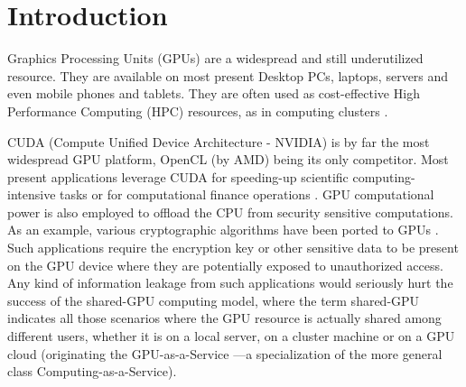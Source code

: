 \documentclass[11pt,onecolumn,letterpaper]{IEEEtran}
\begin{document}
\section{Introduction}

Graphics Processing Units (GPUs) are a widespread and still underutilized resource.
They are available on most present Desktop PCs, laptops, servers and even mobile phones and tablets.
They are often used as cost-effective High Performance Computing (HPC) resources, as in computing clusters \cite{titan}. 


CUDA (Compute Unified Device Architecture - NVIDIA\texttrademark) is by far the most widespread GPU platform, OpenCL (by AMD\texttrademark) being its only competitor.
Most present applications leverage CUDA for speeding-up scientific computing-intensive tasks
or for computational finance operations \cite{computationalfinancegpu}.
GPU computational power is also employed to offload the CPU from  security sensitive computations.
As an example, various cryptographic algorithms have been ported to GPUs 
\cite{aes-gpu, aescuda,aes-xts, symmetriccudageneric, designingGPUencryption, aescudaanalysis, gpuparallcrypto}.
Such applications require the encryption key or other sensitive data
to be present on the GPU device where they are potentially exposed to unauthorized access.
Any kind of information leakage from such applications would seriously hurt the success of the
shared-GPU computing model, where the term shared-GPU indicates all those scenarios where the GPU resource is actually shared among different users,
whether it is on a local server, on a cluster machine or on a GPU cloud \cite{Georgescu:2011:GAC:2082156.2082161} 
(originating the GPU-as-a-Service ---a specialization of the more general class Computing-as-a-Service).
\end{document}
